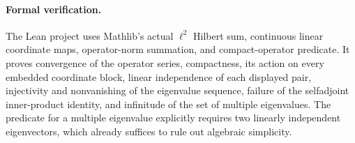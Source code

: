 \documentclass[11pt]{article}
\begin{document}
\paragraph{Formal verification.}
The Lean project uses Mathlib's actual $\ell^2$ Hilbert sum, continuous linear coordinate maps, operator-norm summation, and compact-operator predicate. It proves convergence of the operator series, compactness, its action on every embedded coordinate block, linear independence of each displayed pair, injectivity and nonvanishing of the eigenvalue sequence, failure of the selfadjoint inner-product identity, and infinitude of the set of multiple eigenvalues. The predicate for a multiple eigenvalue explicitly requires two linearly independent eigenvectors, which already suffices to rule out algebraic simplicity.
\end{document}
